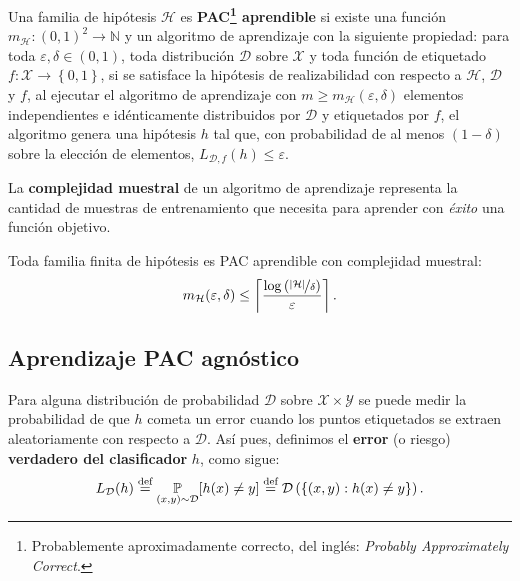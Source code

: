\documentclass[8pt,a4paper]{extarticle}
\begin{document}
\begin{multicols}{3}
\begin{boxdef}
	Una familia de hipótesis $\mathcal{H}$ es \textbf{PAC\footnote{Probablemente aproximadamente correcto, del inglés: \emph{Probably Approximately Correct}.} aprendible} si existe una función $m_{\mathcal{H}} : (0,1)^2 \to \mathbb{N}$ y un algoritmo de aprendizaje con la siguiente propiedad: \textcolor{dred}{para toda $\varepsilon, \delta \in (0,1)$, toda distribución $\mathcal{D}$ sobre $ \mathcal{X}$ y toda función de etiquetado $f : \mathcal{X} \to \left\{ 0,1 \right\} $, si se satisface la hipótesis de realizabilidad con respecto a $\mathcal{H}$, $\mathcal{D}$ y $f$, al ejecutar el algoritmo de aprendizaje con  $m \ge m_{\mathcal{H}} (\varepsilon, \delta)$ elementos independientes e idénticamente distribuidos por $\mathcal{D}$ y etiquetados por $f$, el algoritmo genera una hipótesis  $h$ tal que, con probabilidad de al menos  $(1 - \delta)$ sobre la elección de elementos,  $L_{\mathcal{D}, f} (h) \le \varepsilon$.}
\end{boxdef}

\begin{boxdef}
	La \textbf{complejidad muestral} de un algoritmo de aprendizaje representa la cantidad de muestras de entrenamiento que necesita para aprender con \emph{éxito} una función objetivo.
\end{boxdef}

\begin{boxcor}[]
	Toda familia finita de hipótesis es PAC aprendible con complejidad muestral:
	\[
		m_{\mathcal{H}}(\varepsilon, \delta) \le \left\lceil \frac{\log \left( \nicefrac{\left| \mathcal{H} \right| }{\delta} \right) }{\varepsilon} \right\rceil 
	.\] 
\end{boxcor}

\subsection{Aprendizaje PAC agnóstico}

\begin{boxdef}
	Para alguna distribución de probabilidad $\mathcal{D}$ sobre $\mathcal{X} \times \mathcal{Y}$ se puede medir la probabilidad de que $h$ cometa un error cuando los puntos etiquetados se extraen aleatoriamente con respecto a $\mathcal{D}$. Así pues, definimos el \textbf{error} (o riesgo) \textbf{verdadero del clasificador} $h$, como sigue:
	 \[
		 L_{\mathcal{D}}(h) \stackrel{\text{\normalfont def}}{=} \underset{(x,y)\sim \mathcal{D}}{\mathbb{P}} [h(x) \neq y] \stackrel{\text{\normalfont def}}{=} \mathcal{D}\left( \{(x, y) : h(x) \neq y\}  \right) 
	.\] 
\end{boxdef}


\end{multicols}
\end{document}
